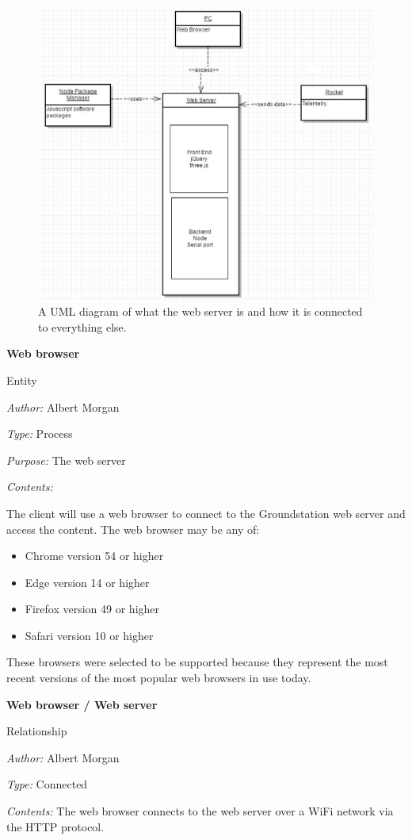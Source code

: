 \documentclass[10pt,draftclsnofoot,onecolumn]{IEEEtran}
\newcommand{\newentity}[5]{

	\noindent\textbf{#2}
	
	\noindent Entity
	
	\noindent\textit{Author:} {#1}
		
	\noindent\textit{Type:} {#3}
	
	\noindent\textit{Purpose:} {#4}

	\noindent\textit{Contents:} {#5}
	\vspace{.5cm}

}
\newcommand{\newrelationship}[4]{
	\noindent\textbf{#2}
	
	\noindent Relationship
	
	\noindent\textit{Author:} #1

	\noindent\textit{Type:} #3

	\noindent\textit{Contents:} #4

	\vspace{.5cm}
}
\begin{document}
	\begin{center}
	\begin{figure}[thbp!]
		\centering\includegraphics[width=170mm]{UMLdiagram1.eps}
		\caption{A UML diagram of what the web server is and how it is connected to everything else.}
		\label{fig:4}
	\end{figure}
	\end{center}
	\clearpage
	\newentity
	{Albert Morgan}
	{Web browser}
	{Process}
	{The web server}
	{	The client will use a web browser to connect to the Groundstation web server and access the content.
		The web browser may be any of:
		\begin{itemize}
			\item Chrome version 54 or higher
			\item Edge version 14 or higher
			\item Firefox version 49 or higher
			\item Safari version 10 or higher
		\end{itemize}
		These browsers were selected to be supported because they represent the most recent versions of the most popular web browsers in use today.
	}

	\newrelationship
	{Albert Morgan}
	{Web browser / Web server}
	{Connected}
	{The web browser connects to the web server over a WiFi network via the HTTP protocol.}
	
\end{document}
